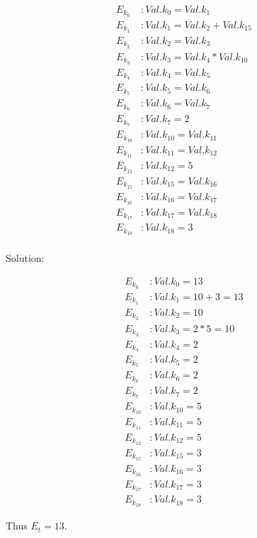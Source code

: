 \begin{equation*}
\begin{aligned}
E_{k_0} &: Val.k_0 = Val.k_1 \\
E_{k_1} &: Val.k_1 = Val.k_2 + Val.k_{15} \\
E_{k_2} &: Val.k_2 = Val.k_3 \\
E_{k_3} &: Val.k_3 = Val.k_4 * Val.k_{10} \\
E_{k_4} &: Val.k_4 = Val.k_5 \\
E_{k_5} &: Val.k_5 = Val.k_6 \\
E_{k_6} &: Val.k_6 = Val.k_7 \\
E_{k_7} &: Val.k_7 = 2 \\
E_{k_{10}} &: Val.k_{10} = Val.k_{11} \\
E_{k_{11}} &: Val.k_{11} = Val.k_{12} \\
E_{k_{12}} &: Val.k_{12} = 5 \\
E_{k_{15}} &: Val.k_{15} = Val.k_{16} \\
E_{k_{16}} &: Val.k_{16} = Val.k_{17} \\
E_{k_{17}} &: Val.k_{17} = Val.k_{18} \\
E_{k_{18}} &: Val.k_{18} = 3 \\
\end{aligned}
\end{equation*}

Solution:

\begin{equation*}
\begin{aligned}
E_{k_0} &: Val.k_0 = 13 \\
E_{k_1} &: Val.k_1 = 10 + 3 = 13 \\
E_{k_2} &: Val.k_2 = 10 \\
E_{k_3} &: Val.k_3 = 2 * 5 = 10 \\
E_{k_4} &: Val.k_4 = 2 \\
E_{k_5} &: Val.k_5 = 2 \\
E_{k_6} &: Val.k_6 = 2 \\
E_{k_7} &: Val.k_7 = 2 \\
E_{k_{10}} &: Val.k_{10} = 5 \\
E_{k_{11}} &: Val.k_{11} = 5 \\
E_{k_{12}} &: Val.k_{12} = 5 \\
E_{k_{15}} &: Val.k_{15} = 3 \\
E_{k_{16}} &: Val.k_{16} = 3 \\
E_{k_{17}} &: Val.k_{17} = 3 \\
E_{k_{18}} &: Val.k_{18} = 3 
\end{aligned}
\end{equation*}

Thus $E_t = 13$.
